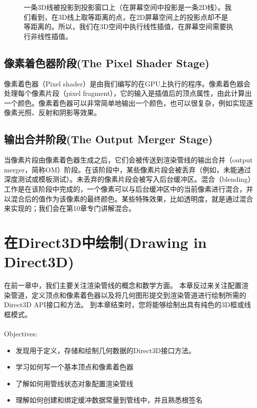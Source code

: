 \documentclass[11pt,a4paper,oldfontcommands]{memoir}
\begin{document}
{\begin{figure}[h]
    \centering
    \caption{一条3D线被投影到投影窗口上（在屏幕空间中投影是一条2D线）。我们看到，在3D线上取等距离的点，在2D屏幕空间上的投影点却不是等距离的。所以，我们在3D空间中执行线性插值，在屏幕空间需要执行非线性插值。}
    \label{fig:5-34}
\end{figure}

\section{像素着色器阶段(The Pixel Shader Stage)}
\begin{flushleft}
像素着色器（Pixel shader）是由我们编写的在GPU上执行的程序。像素着色器会处理每个像素片段（pixel fragment），它的输入是插值后的顶点属性，由此计算出一个颜色。像素着色器可以非常简单地输出一个颜色，也可以很复杂，例如实现逐像素光照、反射和阴影等效果。
\end{flushleft}
\section{输出合并阶段(The Output Merger Stage)}
\begin{flushleft}
当像素片段由像素着色器生成之后，它们会被传送到渲染管线的输出合并（output
merger，简称OM）阶段。在该阶段中，某些像素片段会被丢弃（例如，未能通过深度测试或模板测试）。未丢弃的像素片段会被写入后台缓冲区。混合（blending）工作是在该阶段中完成的，一个像素可以与后台缓冲区中的当前像素进行混合，并以混合后的值作为该像素的最终颜色。某些特殊效果，比如透明度，就是通过混合来实现的；我们会在第10章专门讲解混合。
\end{flushleft}

\chapter{在Direct3D中绘制(Drawing in Direct3D)}
\begin{flushleft}
在前一章中，我们主要关注渲染管线的概念和数学方面。 本章反过来关注配置渲染管道，定义顶点和像素着色器以及将几何图形提交到渲染管道进行绘制所需的Direct3D API接口和方法。 到本章结束时，您将能够绘制出具有纯色的3D框或线框模式。\\
~\\
{\large Objectives:}
\begin{itemize}
	\item 发现用于定义，存储和绘制几何数据的Direct3D接口方法。
	\item 学习如何写一个基本顶点和像素着色器
	\item 了解如何用管线状态对象配置渲染管线
	\item 理解如何创建和绑定缓冲数据常量到管线中，并且熟悉根签名
\end{itemize}
\end{flushleft}
}
\end{document}
